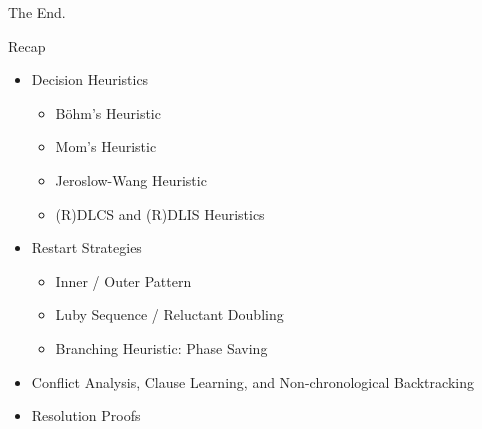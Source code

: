 \documentclass[t]{sdqbeamer}
\begin{document}
\begin{frame}{The End.}
\begin{block}{Recap}
	\begin{itemize}\setlength{\itemsep}{1em}
		\item Decision Heuristics
		\begin{itemize}\setlength{\itemsep}{1ex}
			\item Böhm's Heuristic
			\item Mom's Heuristic
			\item Jeroslow-Wang Heuristic
			\item (R)DLCS and (R)DLIS Heuristics
		\end{itemize}
		\item Restart Strategies
		\begin{itemize}\setlength{\itemsep}{1ex}
			\item Inner / Outer Pattern
			\item Luby Sequence / Reluctant Doubling
			\item Branching Heuristic: Phase Saving
		\end{itemize}
		\item Conflict Analysis, Clause Learning, and Non-chronological Backtracking
		\item Resolution Proofs
	\end{itemize}
\end{block}
\end{frame}
\end{document}

